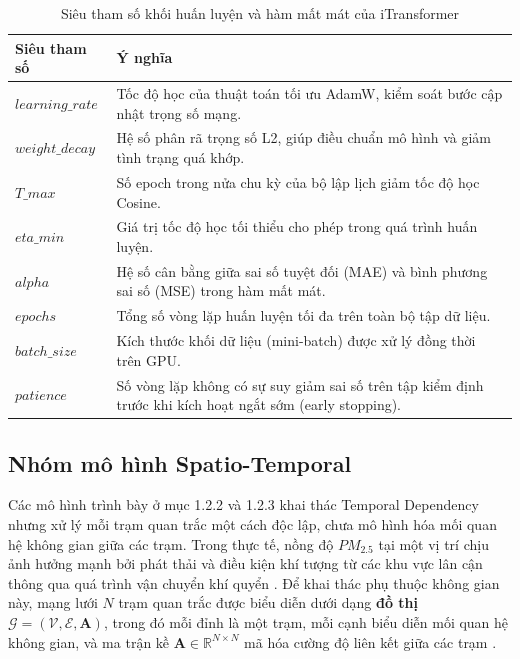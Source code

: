 \begin{table}[H]
\centering
\caption{Siêu tham số khối huấn luyện và hàm mất mát của iTransformer}
\label{tab:itrans_optim}
\renewcommand{\arraystretch}{1.3}
\begin{tabular}{p{3.8cm} p{10.5cm}}
\toprule
\textbf{Siêu tham số} & \textbf{Ý nghĩa} \\
\midrule
$learning\_rate$ & Tốc độ học của thuật toán tối ưu AdamW, kiểm soát bước cập nhật trọng số mạng. \\
$weight\_decay$ & Hệ số phân rã trọng số L2, giúp điều chuẩn mô hình và giảm tình trạng quá khớp. \\
$T\_max$ & Số epoch trong nửa chu kỳ của bộ lập lịch giảm tốc độ học Cosine. \\
$eta\_min$ & Giá trị tốc độ học tối thiểu cho phép trong quá trình huấn luyện. \\
$alpha$ & Hệ số cân bằng giữa sai số tuyệt đối (MAE) và bình phương sai số (MSE) trong hàm mất mát. \\
$epochs$ & Tổng số vòng lặp huấn luyện tối đa trên toàn bộ tập dữ liệu. \\
$batch\_size$ & Kích thước khối dữ liệu (mini-batch) được xử lý đồng thời trên GPU. \\
$patience$ & Số vòng lặp không có sự suy giảm sai số trên tập kiểm định trước khi kích hoạt ngắt sớm (early stopping). \\
\bottomrule
\end{tabular}
\end{table}

\subsection{Nhóm mô hình Spatio-Temporal}

Các mô hình trình bày ở mục 1.2.2 và 1.2.3 khai thác Temporal Dependency nhưng xử lý mỗi trạm quan trắc một cách độc lập, chưa mô hình hóa mối quan hệ không gian giữa các trạm. Trong thực tế, nồng độ $PM_{2.5}$ tại một vị trí chịu ảnh hưởng mạnh bởi phát thải và điều kiện khí tượng từ các khu vực lân cận thông qua quá trình vận chuyển khí quyển \cite{dam2024pm25}. Để khai thác phụ thuộc không gian này, mạng lưới $N$ trạm quan trắc được biểu diễn dưới dạng \textbf{đồ thị} $\mathcal{G} = (\mathcal{V}, \mathcal{E}, \mathbf{A})$, trong đó mỗi đỉnh là một trạm, mỗi cạnh biểu diễn mối quan hệ không gian, và ma trận kề $\mathbf{A} \in \mathbb{R}^{N \times N}$ mã hóa cường độ liên kết giữa các trạm \cite{panja2025estgcn}.

